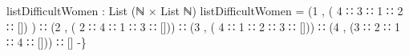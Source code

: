 \documentclass{article}
\begin{document}
\begin{code}
{listDifficultWomen : List (ℕ × List ℕ)
listDifficultWomen = (1 , ( 4 ∷ 3 ∷ 1 ∷ 2 ∷ []) ) ∷ (2 , ( 2 ∷ 4 ∷ 1 ∷ 3 ∷ [])) ∷ (3 , ( 4 ∷ 1 ∷ 2 ∷ 3 ∷ [])) ∷ (4 , (3 ∷ 2 ∷ 1 ∷ 4 ∷ [])) ∷ []
-\}}\<%
\\
%
\\[\AgdaEmptyExtraSkip]%
%
\\[\AgdaEmptyExtraSkip]%
\>[0]\<%
\\
%
\\[\AgdaEmptyExtraSkip]%
\>[0]\<%
\\
\>[0]\AgdaSpace{}%
\AgdaSpace{}%
\AgdaSymbol{\{}\AgdaSpace{}%
\AgdaSymbol{:}\AgdaSpace{}%
\AgdaSymbol{\}(}\AgdaSpace{}%
\AgdaSymbol{:}\AgdaSpace{}%
\AgdaSymbol{)}\AgdaSpace{}%
\AgdaSymbol{:}\AgdaSpace{}%
\AgdaSpace{}%
\AgdaSpace{}%
\AgdaSpace{}%
\AgdaSpace{}%
\<%
\\
\>[0][@{}l@{\AgdaIndent{0}}]%
\>[2]%
\>[8]\AgdaSymbol{:}\AgdaSpace{}%
\AgdaSymbol{(}\AgdaSpace{}%
\AgdaSymbol{:}\AgdaSpace{}%
\AgdaSpace{}%
\AgdaSymbol{)}\AgdaSpace{}%
\AgdaSpace{}%
\AgdaSpace{}%
\AgdaSpace{}%
\AgdaSymbol{(}\AgdaSpace{}%
\AgdaSpace{}%
\AgdaSymbol{)}\<%
\\
%
\>[2]\AgdaSpace{}%
\AgdaSymbol{:}\AgdaSpace{}%
\AgdaSymbol{\{}\AgdaSpace{}%
\AgdaSymbol{:}\AgdaSpace{}%
\AgdaSymbol{\}\{}\AgdaSpace{}%
\AgdaSymbol{:}\AgdaSpace{}%
\AgdaSpace{}%
\AgdaSymbol{\}}\AgdaSpace{}%
\AgdaSpace{}%
\AgdaSpace{}%
\AgdaSpace{}%
\AgdaSpace{}%
\AgdaSpace{}%
\AgdaSpace{}%
\AgdaSpace{}%
\AgdaSymbol{(}\AgdaSpace{}%
\AgdaSpace{}%
\AgdaSymbol{)}\<%
\\
%
\\[\AgdaEmptyExtraSkip]%
\>[0]\<%
\\
\>[0]\AgdaSpace{}%

\end{code}
\end{document}
